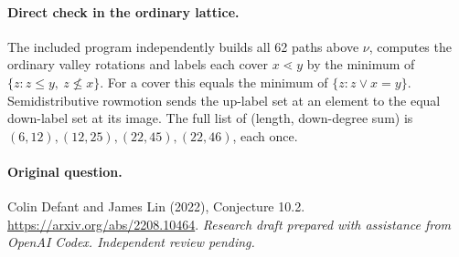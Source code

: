 \documentclass[11pt]{article}
\begin{document}
\paragraph{Direct check in the ordinary lattice.} The included program independently builds all 62 paths above $\nu$, computes the ordinary valley rotations and labels each cover $x\lessdot y$ by the minimum of $\{z:z\le y,\ z\not\le x\}$. For a cover this equals the minimum of $\{z:z\vee x=y\}$. Semidistributive rowmotion sends the up-label set at an element to the equal down-label set at its image. The full list of (length, down-degree sum) is $(6,12),(12,25),(22,45),(22,46)$, each once.

\paragraph{Original question.} Colin Defant and James Lin (2022), Conjecture 10.2. \url{https://arxiv.org/abs/2208.10464}.
\medskip\noindent\textit{Research draft prepared with assistance from OpenAI Codex. Independent review pending.}
\end{document}
